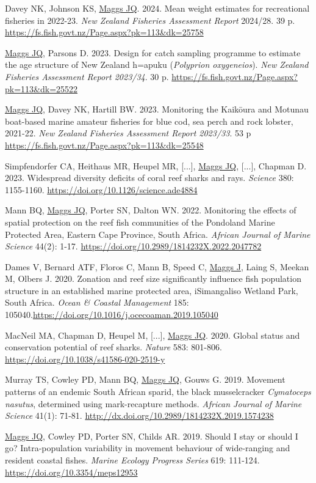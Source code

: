 \documentclass[10pt,a4paper]{article}
\begin{document}
\begin{hangparas}{1.5em}{1}
Davey NK, Johnson KS, \underline{Maggs JQ}. 2024. Mean weight estimates for recreational fisheries in 2022-23. \textit{New Zealand Fisheries Assessment Report} 2024/28. 39 p. \url{https://fs.fish.govt.nz/Page.aspx?pk=113&dk=25758}

\underline{Maggs JQ}, Parsons D. 2023. Design for catch sampling programme to estimate the age structure of New Zealand h\a=apuku (\textit{Polyprion oxygeneios}). \textit{New Zealand Fisheries Assessment Report 2023/34}. 30 p. \url{https://fs.fish.govt.nz/Page.aspx?pk=113&dk=25522}

\underline{Maggs JQ}, Davey NK, Hartill BW. 2023. Monitoring the Kaik\=oura and Motunau boat-based marine amateur fisheries for blue cod, sea perch and rock lobster, 2021-22. \textit{New Zealand Fisheries Assessment Report 2023/33}. 53 p \url{https://fs.fish.govt.nz/Page.aspx?pk=113&dk=25548}

Simpfendorfer CA, Heithaus MR, Heupel MR, [...], \underline{Maggs JQ}, [...], Chapman D. 2023. Widespread diversity deficits of coral reef sharks and rays. \textit{Science} 380: 1155-1160. \url{https://doi.org/10.1126/science.ade4884}

Mann BQ, \underline{Maggs JQ}, Porter SN, Dalton WN. 2022. Monitoring the effects of spatial protection on the reef fish communities of the Pondoland Marine Protected Area, Eastern Cape Province, South Africa. \textit{African Journal of Marine Science} 44(2): 1-17. \url{https://doi.org/10.2989/1814232X.2022.2047782}

Dames V, Bernard ATF, Floros C, Mann B, Speed C, \underline{Maggs J}, Laing S, Meekan M, Olbers J. 2020. Zonation and reef size significantly influence fish population structure in an established marine protected area, iSimangaliso Wetland Park, South Africa. \textit{Ocean \& Coastal Management} 185: 105040.\url{https://doi.org/10.1016/j.ocecoaman.2019.105040}

MacNeil MA, Chapman D, Heupel M, [...], \underline{Maggs JQ}. 2020. Global status and conservation potential of reef sharks. \textit{Nature} 583: 801-806. \url{https://doi.org/10.1038/s41586-020-2519-y}

Murray TS, Cowley PD, Mann BQ, \underline{Maggs JQ}, Gouws G. 2019. Movement patterns of an endemic South African sparid, the black musselcracker \textit{Cymatoceps nasutus}, determined using mark-recapture methods. \textit{African Journal of Marine Science} 41(1): 71-81. \url{http://dx.doi.org/10.2989/1814232X.2019.1574238}

\underline{Maggs JQ}, Cowley PD, Porter SN, Childs AR. 2019. Should I stay or should I go? Intra-population variability in movement behaviour of wide-ranging and resident coastal fishes. \textit{Marine Ecology Progress Series} 619: 111-124. \url{https://doi.org/10.3354/meps12953}


\end{hangparas}
\end{document}
